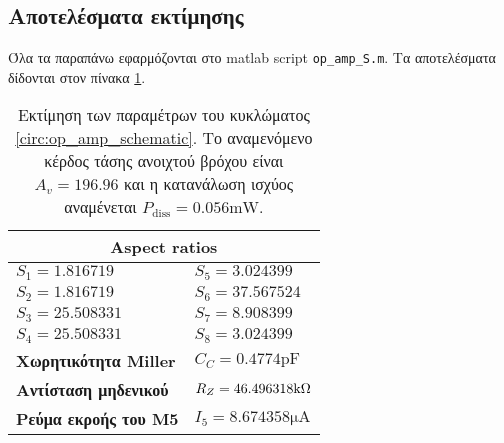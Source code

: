 \subsection{Αποτελέσματα εκτίμησης}
Όλα τα παραπάνω εφαρμόζονται στο matlab script \texttt{op\_amp\_S.m}. Τα αποτελέσματα δίδονται στον πίνακα \ref{table:estimate}.

\begin{table}[H]
	\begin{center}
		\begin{tabular}{|l|l|}
			\hline
			\multicolumn{2}{|c|}{\textbf{Aspect ratios}}                        \\\hline
			$S_1 = 1.816719$             & $S_5 = 3.024399$                     \\\hline
			$S_2 = 1.816719$             & $S_6 = 37.567524$                    \\\hline
			$S_3 = 25.508331$            & $S_7 = 8.908399$                     \\\hline
			$S_4 = 25.508331$            & $S_8 = 3.024399$                     \\\hline\hline
			\textbf{Χωρητικότητα Miller} & $C_C=0.4774\unit{\pico\farad}$       \\\hline
			\textbf{Αντίσταση μηδενικού} & $R_Z=46.496318\kohm$                 \\\hline
			\textbf{Ρεύμα εκροής του M5} & $I_5 = 8.674358\unit{\micro\ampere}$ \\\hline
		\end{tabular}
		\caption{Εκτίμηση των παραμέτρων του κυκλώματος \ref{circ:op_amp_schematic}. Το αναμενόμενο κέρδος τάσης ανοιχτού βρόχου είναι $A_v=196.96$ και η κατανάλωση ισχύος αναμένεται $P_{\mathrm{diss}}=0.056\unit{\milli\watt}$.}
		\label{table:estimate}
	\end{center}
\end{table}